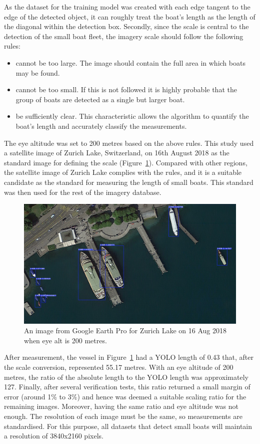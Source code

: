 As the dataset for the training model was created with each edge tangent to the edge of the detected object, it can roughly treat the boat's length as the length of the diagonal within the detection box. Secondly, since the scale is central to the detection of the small boat fleet, the imagery scale should follow the following rules:
\begin{itemize}
    \item cannot be too large. The image should contain the full area in which boats may be found.
    \item cannot be too small. If this is not followed it is highly probable that the group of boats are detected as a single but larger boat.
    \item be sufficiently clear. This characteristic allows the algorithm to quantify the boat's length and accurately classify the measurements.
\end{itemize}


The eye altitude was set to 200 metres based on the above rules. This study used a satellite image of Zurich Lake, Switzerland, on 16th August 2018 as the standard image for defining the scale (Figure~\ref{fig:zurich}). Compared with other regions, the satellite image of Zurich Lake complies with the rules, and it is a suitable candidate as the standard for measuring the length of small boats. This standard was then used for the rest of the imagery database.

\begin{figure}[!t]
    \centering
    \includegraphics[width=\columnwidth]{img/zurich.jpeg}
    \caption{An image from Google Earth Pro for Zurich Lake on 16 Aug 2018 when eye alt is 200 metres.}
    \label{fig:zurich}
\end{figure}

After measurement, the vessel in Figure~\ref{fig:zurich} had a YOLO length of 0.43 that, after the scale conversion, represented 55.17 metres. With an eye altitude of 200 metres, the ratio of the absolute length to the YOLO length was approximately 127. Finally, after several verification tests, this ratio returned a small margin of error (around 1\% to 3\%) and hence was deemed a suitable scaling ratio for the remaining images. Moreover, having the same ratio and eye altitude was not enough. The resolution of each image must be the same, so measurements are standardised. For this purpose, all datasets that detect small boats will maintain a resolution of 3840x2160 pixels.

